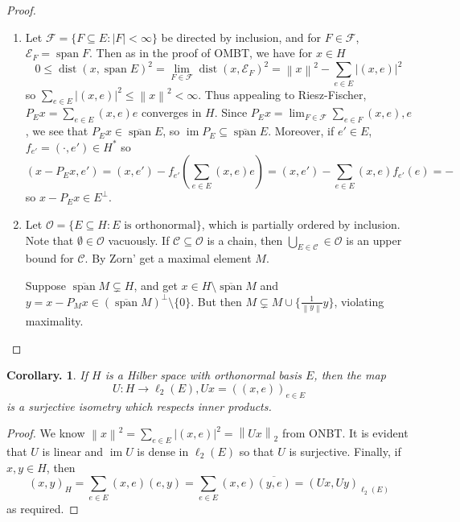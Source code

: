 \documentclass[11pt, a4paper]{memoir}
\newcommand{\norm}[1]{\ensuremath{\left\lVert#1\right\rVert}}
\theoremstyle{change}
\newtheorem{corollary}[theorem]{Corollary.}
\theoremstyle{plain}
\theoremstyle{nonumberplain}
\newtheorem{proof}{Proof}
\DeclareMathOperator{\im}{im}
\DeclareMathOperator{\spn}{span}
\DeclareMathOperator{\dist}{dist}
\newcommand{\inr}[1]{\ensuremath{\left(#1\right)}}
\numberwithin{equation}{section}
\begin{document}
\begin{proof}
    \begin{enumerate}[r]
        \item Let $\mathcal{F}=\{F\subseteq E:|F|<\infty\}$ be directed by inclusion, and for $F\in\mathcal{F}$, $\mathcal{E}_F=\spn F$.
            Then as in the proof of OMBT, we have for $x\in H$
            \begin{equation*}
                0\leq \dist(x,\spn E)^2=\lim_{F\in\mathcal{F}}\dist(x,\mathcal{E}_F)^2=\norm{x}^2-\sum_{e\in E}|\inr{x,e}|^2
            \end{equation*}
            so $\sum_{e\in E}|\inr{x,e}|^2\leq\norm{x}^2<\infty$.
            Thus appealing to Riesz-Fischer, $P_Ex=\sum_{e\in E}\inr{x,e}e$ converges in $H$.
            Since $P_Ex=\lim_{F\in\mathcal{F}}\sum_{e\in F}\inr{x,e},e$, we see that $P_Ex\in\overline{\spn}E$, so $\im P_E\subseteq\overline{\spn}E$.
            Moreover, if $e'\in E$, $f_{e'}=\inr{\cdot,e'}\in H^*$ so
            \begin{equation*}
                \inr{x-P_Ex,e'}=\inr{x,e'}-f_{e'}\left(\sum_{e\in E}\inr{x,e}e\right)=\inr{x,e'}-\sum_{e\in E}\inr{x,e}f_{e'}(e)=-
            \end{equation*}
            so $x-P_Ex\in E^\perp$.
        \item Let $\mathcal{O}=\{E\subseteq H:E\text{ is orthonormal}\}$, which is partially ordered by inclusion.
            Note that $\emptyset\in\mathcal{O}$ vacuously.
            If $\mathcal{C}\subseteq\mathcal{O}$ is a chain, then $\bigcup_{E\in\mathcal{C}}\in\mathcal{O}$ is an upper bound for $\mathcal{C}$.
            By Zorn' get a maximal element $M$.

            Suppose $\overline{\spn} M\subsetneq H$, and get $x\in H\setminus \overline{\spn} M$ and $y=x-P_Mx\in(\overline{\spn} M)^\perp\setminus\{0\}$.
            But then $M\subsetneq M\cup\{\frac{1}{\norm{y}}y\}$, violating maximality.
    \end{enumerate}
\end{proof}
\begin{corollary}
    If $H$ is a Hilber space with orthonormal basis $E$, then the map
    \begin{equation*}
        U:H\to\ell_2(E), Ux=(\inr{x,e})_{e\in E}
    \end{equation*}
    is a surjective isometry which respects inner products.
\end{corollary}
\begin{proof}
    We know $\norm{x}^2=\sum_{e\in E}|\inr{x,e}|^2=\norm{Ux}_2$ from ONBT.
    It is evident that $U$ is linear and $\im U$ is dense in $\ell_2(E)$ so that $U$ is surjective.
    Finally, if $x,y\in H$, then
    \begin{equation*}
        \inr{x,y}_H=\sum_{e\in E}\inr{x,e}\inr{e,y}=\sum_{e\in E}\inr{x,e}\overline{\inr{y,e}}=\inr{Ux,Uy}_{\ell_2(E)}
    \end{equation*}
    as required.
\end{proof}
\end{document}
